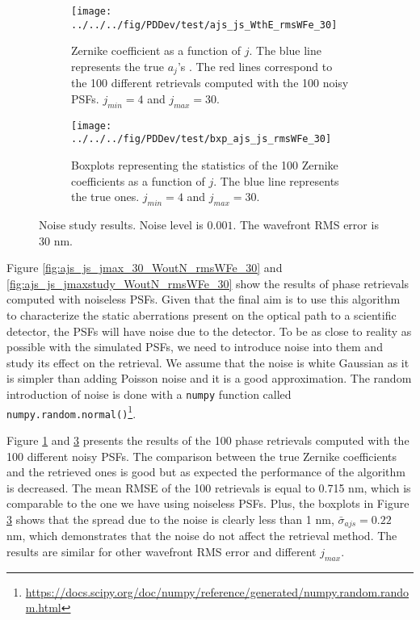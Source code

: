 \begin{figure}
\centering
    \begin{subfigure}{0.45\textwidth}
        \texttt{[image: ../../../fig/PDDev/test/ajs\_js\_WthE\_rmsWFe\_30]}
        \caption{Zernike coefficient as a function of $j$.  The blue line represents the true $a_j$'s . The red lines correspond to the 100 different retrievals computed with the 100 noisy PSFs. $j_{min}=4$ and $j_{max}=30$.}
        \label{subfig:ajs_js_WthE_rmsWFe_30}
    \end{subfigure}
    \quad
    \begin{subfigure}{0.45\textwidth}
        \texttt{[image: ../../../fig/PDDev/test/bxp\_ajs\_js\_rmsWFe\_30]}
        \caption{Boxplots representing the statistics of the 100 Zernike coefficients as a function of $j$. The blue line represents the true ones. $j_{min}=4$ and $j_{max}=30$.}
        \label{subfig:bxp_ajs_js_rmsWFe_30}
    \end{subfigure}
    \decoRule
    \caption{Noise study results. Noise level is $0.001$. The wavefront RMS error is 30 nm.}
\end{figure}

Figure \ref{fig:ajs_js_jmax_30_WoutN_rmsWFe_30} and \ref{fig:ajs_js_jmaxstudy_WoutN_rmsWFe_30} show the results of phase retrievals computed with noiseless PSFs. Given that the final aim is to use this algorithm to characterize the static aberrations present on the optical path to a scientific detector, the PSFs will have noise due to the detector. To be as close to reality as possible with the simulated PSFs, we need to introduce noise into them and study its effect on the retrieval. We assume that the noise is white Gaussian as it is simpler than adding Poisson noise and it is a good approximation. The random introduction of noise is done with a \verb!numpy! function called \verb!numpy.random.normal()!\footnote{\url{https://docs.scipy.org/doc/numpy/reference/generated/numpy.random.random.html}}.

Figure \ref{subfig:ajs_js_WthE_rmsWFe_30} and \ref{subfig:bxp_ajs_js_rmsWFe_30} presents the results of the 100 phase retrievals computed with the 100 different noisy PSFs. The comparison between the true Zernike coefficients and the retrieved ones is good but as expected the performance of the algorithm is decreased. The mean RMSE of the 100 retrievals is equal to 0.715 nm, which is comparable to the one we have using noiseless PSFs. Plus, the boxplots in Figure \ref{subfig:bxp_ajs_js_rmsWFe_30} shows that the spread due to the noise is clearly less than 1 nm, $\bar{\sigma}_{ajs} = 0.22$ nm, which demonstrates that the noise do not affect the retrieval method. The results are similar for other wavefront RMS error and different $j_{max}$.

